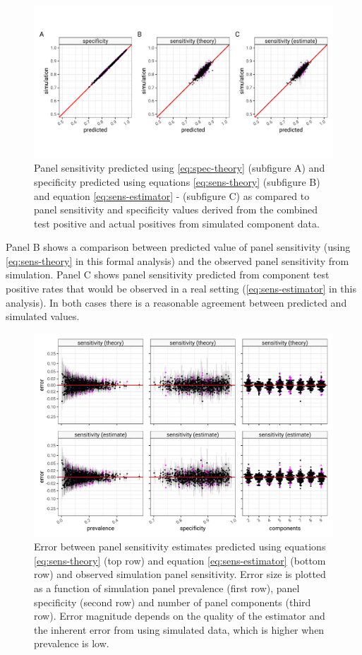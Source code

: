 \documentclass[a4paper, 12pt, twoside]{article}
\begin{document}
\begin{figure}[h!]
\centering
  \includegraphics{fig/qq-prediction-v-simulation.png}
  \caption{Panel sensitivity predicted using \eqref{eq:spec-theory} (subfigure A) and specificity predicted using equations \eqref{eq:sens-theory} (subfigure B) and equation \eqref{eq:sens-estimator} - (subfigure C) as compared to panel sensitivity and specificity values derived from the  combined test positive and actual positives from simulated component data.}
\label{fig:A4}
\end{figure}

Panel B shows a comparison between predicted value of panel sensitivity (using \eqref{eq:sens-theory} in this formal analysis) and the observed panel sensitivity from simulation. Panel C shows panel sensitivity predicted from component test positive rates that would be observed in a real setting (\eqref{eq:sens-estimator} in this analysis). In both cases there is a reasonable agreement between predicted and simulated values.

\begin{figure}[h!]
\centering
  \includegraphics{fig/error-prediction-v-simulation.png}
  \caption{Error between panel sensitivity estimates predicted using equations \eqref{eq:sens-theory} (top row) and equation \eqref{eq:sens-estimator} (bottom row) and observed simulation panel sensitivity. Error size is plotted as a function of simulation panel prevalence (first row), panel specificity (second row) and number of panel components (third row). Error magnitude depends on the quality of the estimator and the inherent error from using simulated data, which is higher when prevalence is low.}
\label{fig:A5}
\end{figure}
\end{document}
